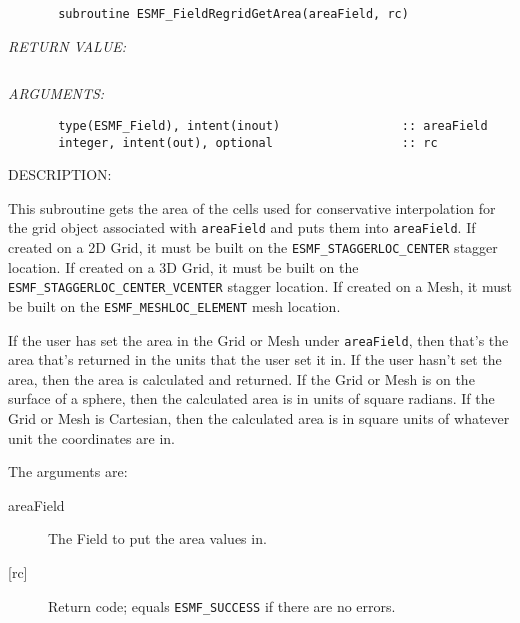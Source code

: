  
\begin{verbatim}       subroutine ESMF_FieldRegridGetArea(areaField, rc)\end{verbatim}{\em RETURN VALUE:}
\begin{verbatim}        \end{verbatim}{\em ARGUMENTS:}
\begin{verbatim}       type(ESMF_Field), intent(inout)                 :: areaField
       integer, intent(out), optional                  :: rc 
 \end{verbatim}
{\sf DESCRIPTION:\\ }


       This subroutine gets the area of the cells used for conservative interpolation for the grid object 
       associated with {\tt areaField} and puts them into {\tt areaField}. If created on a 2D Grid, it must 
       be built on the {\tt ESMF\_STAGGERLOC\_CENTER} stagger location. 
       If created on a 3D Grid, it must be built on the {\tt ESMF\_STAGGERLOC\_CENTER\_VCENTER} stagger 
       location. If created on a Mesh, it must be built on the {\tt ESMF\_MESHLOC\_ELEMENT} mesh location. 
  
       If the user has set the area in the Grid or Mesh under {\tt areaField}, then that's the area that's
       returned in the units that the user set it in. If the user hasn't set the area, then the area is 
       calculated and returned. If the Grid or Mesh is on the surface of a sphere, then the calculated area is in
       units of square radians. If the Grid or Mesh is 
       Cartesian, then the calculated area is in square units of whatever unit the coordinates are in. 
  
       The arguments are:
       \begin{description}
       \item [areaField]
             The Field to put the area values in. 
       \item [{[rc]}]
             Return code; equals {\tt ESMF\_SUCCESS} if there are no errors.
       \end{description}
  
\setlength{\parskip}{\oldparskip}
\setlength{\parindent}{\oldparindent}
\setlength{\baselineskip}{\oldbaselineskip}
